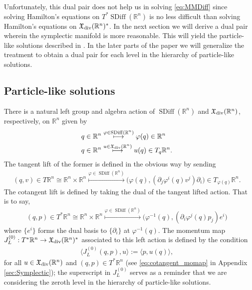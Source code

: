 \documentclass[12pt]{amsart}
\newcommand{\R}{\ensuremath{\mathbb{R}}}
\DeclareMathOperator{\SDiff}{SDiff}
\begin{document}
Unfortunately, this dual pair does not help us in solving \eqref{eq:MMDiff}
since solving Hamilton's equations on $T^*\SDiff(\R^n)$ is no less difficult
than solving Hamilton's equations on $\mathfrak{X}_{\rm div}(\R^n)^*$.
In the next section we will derive a dual pair wherein the symplectic
manifold is more reasonable.
This will yield the particle-like solutions described in \cite{MumfordMichor2013}. In the later parts of the paper we will generalize the treatment to obtain a  dual pair for each level in the hierarchy of particle-like solutions.

\subsection{Particle-like solutions}
\label{sec:Momentum maps}
There is a natural left group and algebra action of $\SDiff(\R^n)$
and $\mathfrak{X}_{\rm div}(\R^n)$, respectively, on $\R^n$ given by
\begin{align*}
  q \in \R^n
  &\stackrel{ \varphi \in \SDiff(\R^n) }{\longmapsto}
  \varphi(q) \in \R^n \\
  q \in \R^n
  &\stackrel{ u \in \mathfrak{X}_{\rm div}(\R^n) }{\longmapsto}
  u(q) \in T_q\R^n.
\end{align*}
The tangent lift of the former is defined in the obvious way by sending
\begin{align*}
  (q,v) \in T\R^n \cong \R^n \times \R^n
  \stackrel{ \varphi \in \SDiff(\R^n) }{\longmapsto}
  \big(\varphi(q) , (\partial_j\varphi^i(q) v^j) \partial_i \big) \in T_{\varphi(q)} \R^n.
\end{align*}
The cotangent lift is defined by taking the dual
of  the tangent lifted action.
That is to say,
\begin{align*}
  (q, p) \in T^*\R^n \cong \R^n \times \R^n
  \stackrel{ \varphi \in \SDiff(\R^n) }{\longmapsto}
  \big(\varphi^{-1}(q) , (\partial_i\varphi^j(q) p_j) e^i \big)
\end{align*}
where $\{e^i\}$ forms the dual basis to $\{\partial_i\}$ at $\varphi^{-1}(q)$.
The momentum map
$J^{(0)}_L : T^*\R^n \to \mathfrak{X}_{\rm div}(\R^n)^*$
associated to this left action is defined by the
condition
\begin{align*}
  \langle J_L^{(0)}( q , p) , u \rangle := \langle p , u(q) \rangle,
\end{align*}
for all $u \in \mathfrak{X}_{\rm div}(\R^n)$ and $(q,p) \in T^*\R^n$ (see \eqref{eq:cotangent_momap} in Appendix \ref{sec:Symplectic}); the superscript in $J_L^{(0)}$ serves as a reminder that we are considering the zeroth level in the hierarchy of particle-like solutions.
\end{document}
